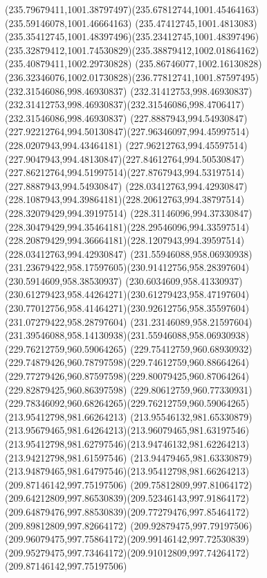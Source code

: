 {{		\curveto(235.79679411,1001.38797497)(235.67812744,1001.45464163)(235.59146078,1001.46664163)
		\curveto(235.47412745,1001.4813083)(235.35412745,1001.48397496)(235.23412745,1001.48397496)
		\curveto(235.32879412,1001.74530829)(235.38879412,1002.01864162)(235.40879411,1002.29730828)
		\curveto(235.86746077,1002.16130828)(236.32346076,1002.01730828)(236.77812741,1001.87597495)
		\moveto(232.31546086,998.46930837)
		\lineto(232.31412753,998.46930837)
		\curveto(232.31412753,998.46930837)(232.31546086,998.4706417)(232.31546086,998.46930837)
		\closepath
		\moveto(227.8887943,994.54930847)
		\curveto(227.92212764,994.50130847)(227.96346097,994.45997514)(228.0207943,994.43464181)
		\curveto(227.96212763,994.45597514)(227.9047943,994.48130847)(227.84612764,994.50530847)
		\curveto(227.86212764,994.51997514)(227.8767943,994.53197514)(227.8887943,994.54930847)
		\moveto(228.03412763,994.42930847)
		\curveto(228.1087943,994.39864181)(228.20612763,994.38797514)(228.32079429,994.39197514)
		\curveto(228.31146096,994.37330847)(228.30479429,994.35464181)(228.29546096,994.33597514)
		\curveto(228.20879429,994.36664181)(228.1207943,994.39597514)(228.03412763,994.42930847)
		\moveto(231.55946088,958.06930938)
		\curveto(231.23679422,958.17597605)(230.91412756,958.28397604)(230.5914609,958.38530937)
		\curveto(230.6034609,958.41330937)(230.61279423,958.44264271)(230.61279423,958.47197604)
		\curveto(230.77012756,958.41464271)(230.92612756,958.35597604)(231.07279422,958.28797604)
		\curveto(231.23146089,958.21597604)(231.39546088,958.14130938)(231.55946088,958.06930938)
		\moveto(229.76212759,960.59064265)
		\curveto(229.75412759,960.68930932)(229.74879426,960.78797598)(229.74612759,960.88664264)
		\curveto(229.77279426,960.87597598)(229.80079425,960.87064264)(229.82879425,960.86397598)
		\curveto(229.80612759,960.77330931)(229.78346092,960.68264265)(229.76212759,960.59064265)
		\moveto(213.95412798,981.66264213)
		\curveto(213.95546132,981.65330879)(213.95679465,981.64264213)(213.96079465,981.63197546)
		\curveto(213.95412798,981.62797546)(213.94746132,981.62264213)(213.94212798,981.61597546)
		\curveto(213.94479465,981.63330879)(213.94879465,981.64797546)(213.95412798,981.66264213)
		\moveto(209.87146142,997.75197506)
		\curveto(209.75812809,997.81064172)(209.64212809,997.86530839)(209.52346143,997.91864172)
		\curveto(209.64879476,997.88530839)(209.77279476,997.85464172)(209.89812809,997.82664172)
		\curveto(209.92879475,997.79197506)(209.96079475,997.75864172)(209.99146142,997.72530839)
		\curveto(209.95279475,997.73464172)(209.91012809,997.74264172)(209.87146142,997.75197506)
}}
